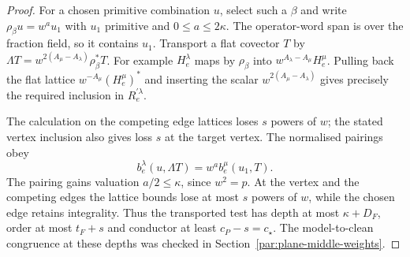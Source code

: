 \begin{proof}
For a chosen primitive combination \(u\), select such a
\(\beta\) and write \(\rho_\beta u=w^a u_1\) with \(u_1\)
primitive and \(0\le a\le2\kappa\). The operator-word
span is over the fraction field, so it contains \(u_1\).
Transport a flat covector \(T\) by
\(\Lambda T=w^{2(A_\mu-A_\lambda)}\rho_\beta^* T\).
For example \(H^\lambda_e\) maps by \(\rho_\beta\)
into \(w^{A_\lambda-A_\mu}H^\mu_e\). Pulling back the
flat lattice \(w^{-A_\mu}(H^\mu_e)^*\) and inserting
the scalar \(w^{2(A_\mu-A_\lambda)}\) gives precisely
the required inclusion in \(R^{\prime\lambda}_e\).

The calculation on the competing edge lattices loses \(s\)
powers of \(w\); the stated vertex inclusion also gives
loss \(s\) at the target vertex. The normalised pairings obey
\[
       b^\lambda_e(u,\Lambda T)=w^a b^\mu_e(u_1,T).
\]
The pairing gains valuation \(a/2\le\kappa\), since
\(w^2=p\). At the vertex and the competing edges the lattice
bounds lose at most \(s\) powers of \(w\), while the chosen
edge retains integrality. Thus the transported test has
depth at most \(\kappa+D_F\), order at most \(t_F+s\)
and conductor at least \(c_P-s=c_\star\).  The model-to-clean
congruence at these depths was checked in
Section~\ref{par:plane-middle-weights}.

\end{proof}



